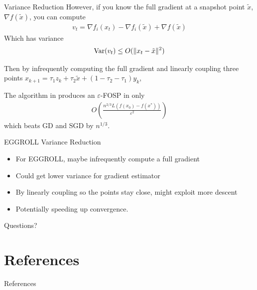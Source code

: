 \documentclass[10pt]{beamer}
\def \ve{\varepsilon}
\newcommand{\mg}[1]{\| #1 \|}
\newcommand{\Var}{\mathrm{Var}\qty}
\renewcommand{\grad}{\nabla}
\newcommand{\1}{\mathbbm{1}}
\begin{document}
\begin{frame}{Variance Reduction}
    However, if you know the full gradient at a snapshot point $\tilde x$, $\grad f(\tilde x)$, you can compute
    \begin{align*}
        v_t = \grad f_i(x_t) - \grad f_i(\tilde x) + \grad f(\tilde x)
    \end{align*}
    Which has variance
    \begin{align*}
        \Var(v_t) \leq O(\mg{x_t - \tilde x}^2)
    \end{align*}

    Then by infrequently computing the full gradient and linearly coupling three points $x_{k+1} = \tau_1 z_k + \tau_2 \tilde x + (1-\tau_2 - \tau_1) y_k$,
    \begin{theorem}
        The algorithm in \cite{allenZhu2016variance} produces an $\ve$-FOSP in only 
        \begin{align*}
            O\left(\frac{n^{2/3}L(f(x_0) - f(x^*))}{\ve^2}\right)
            \end{align*}
            which beats GD and SGD by $n^{1/3}$.
        \end{theorem}
\end{frame}

\begin{frame}{EGGROLL Variance Reduction}
    \begin{itemize}
        \item For EGGROLL, maybe infrequently compute a full gradient
        \item Could get lower variance for gradient estimator 
        \item By linearly coupling so the points stay close, might exploit more descent
        \item Potentially speeding up convergence.
    \end{itemize}
\end{frame}

{
\begin{frame}[standout]
  Questions?
\end{frame}
}

\section{References}
\begin{frame}[allowframebreaks]{References}

  
  

\end{frame}
\end{document}
